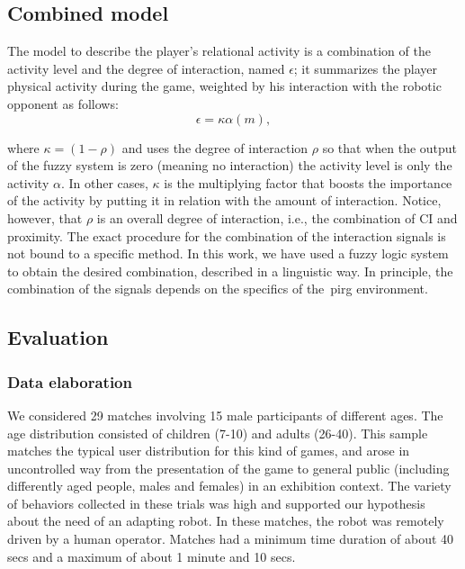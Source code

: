 \subsection{Combined model}\label{sec:engagement}
The model to describe the player's relational activity is a combination of the activity level and the degree of interaction, named $\epsilon$; it summarizes the player physical activity during the game, weighted by his interaction with the robotic opponent as follows: 
\begin{equation}
\label{enagementeq}
\epsilon=\kappa\alpha(m),
\end{equation}

where $\kappa= (1-\rho)$ and uses the degree of interaction $\rho$ so that when the output of the fuzzy %
 system is zero (meaning no interaction) the activity level is only the activity $\alpha$. In other cases, $\kappa$ is the multiplying factor that boosts the importance of the activity by putting it in relation with the amount of interaction.  %
Notice, however, that $\rho$ is an overall degree of interaction, i.e., the combination of CI and proximity. The exact procedure for the combination of the interaction signals is not bound to a specific method. In this work, we have used a fuzzy logic system to obtain the desired combination, described in a linguistic way. In principle, the combination of the signals depends on the specifics of the~\gls{pirg} environment.


\subsection{Evaluation}\label{sec:simple_evalution}
\subsubsection{Data elaboration}
We considered 29 matches involving 15 male participants of different ages. The age distribution consisted of children (7-10) and adults (26-40). This sample matches the typical user distribution for this kind of games, and arose in uncontrolled way from the presentation of the game to general public (including differently aged people, males and females) in an exhibition context. The variety of behaviors collected in these trials was high and supported our hypothesis about the need of an adapting robot. In these matches, the robot was remotely driven by a human operator. Matches had a minimum time duration of about 40 secs and a maximum of about 1 minute and 10 secs. 

